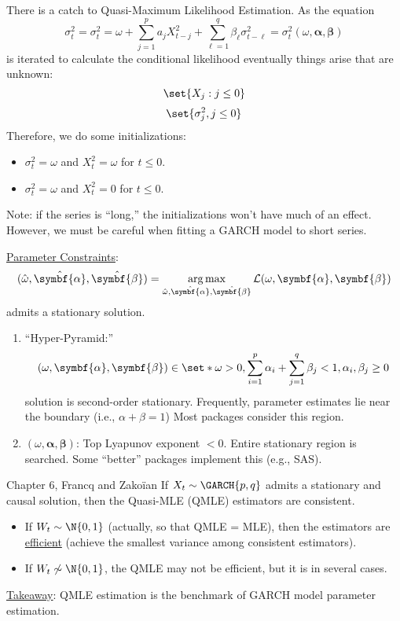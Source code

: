 \begin{Remark}{}{}
    There is a catch to Quasi-Maximum Likelihood Estimation. As the equation
    \[ \sigma_t^2=\sigma_t^2=\omega+\sum_{j=1}^{p} a_j X_{t-j}^2+\sum_{\ell=1}^{q} \beta_\ell \sigma_{t-\ell}^2=\sigma_t^2(\omega,\symbf{\alpha},\symbf{\beta}) \]
    is iterated to calculate the conditional likelihood eventually things arise that are unknown:
    \[ \set{X_j:j\le 0} \]
    \[ \set{\sigma_j^2,j\le 0} \]
    Therefore, we do some initializations:
    \begin{itemize}
        \item $ \sigma_t^2=\omega $ and $ X_t^2=\omega $ for $ t\le 0 $.
        \item $ \sigma_t^2=\omega $ and $ X_t^2=0 $ for $ t\le 0 $.
    \end{itemize}
    Note: if the series is ``long,'' the initializations won't have much of an effect.
    However, we must be careful when fitting a GARCH model to short series.
\end{Remark}
\underline{Parameter Constraints}:
\[ (\hat{\omega},\hat{\symbf{\alpha}},\hat{\symbf{\beta}})=\argmax_{\hat{\omega},\hat{\symbf{\alpha}},\hat{\symbf{\beta}}}\mathcal{L}(\omega,\symbf{\alpha},\symbf{\beta}) \]
admits a stationary solution.
\begin{enumerate}[(1)]
    \item ``Hyper-Pyramid:''
          \[ (\omega,\symbf{\alpha},\symbf{\beta})\in\set*{\omega>0,\sum_{i=1}^{p} \alpha_i+\sum_{j=1}^{q} \beta_j<1,\alpha_i,\beta_j\ge 0} \]
          solution is second-order stationary. Frequently, parameter
          estimates lie near the boundary (i.e., $ \alpha + \beta = 1$) Most packages consider this region.
    \item $ (\omega,\symbf{\alpha},\symbf{\beta}) $: Top Lyapunov exponent $ <0 $. Entire
          stationary region is searched. Some ``better'' packages implement this (e.g., SAS).
\end{enumerate}
\begin{Theorem}{Chapter 6, Francq and Zakoïan}{}
    If $ X_t \sim \GARCH{p,q} $ admits a stationary and causal solution, then
    the Quasi-MLE (QMLE) estimators are consistent.

    \begin{itemize}
        \item If $ W_t \sim \N{0,1} $ (actually, so that QMLE = MLE),
              then the estimators are \underline{efficient} (achieve the smallest variance among consistent estimators).
        \item If $ W_t\not\sim \N{0,1} $, the QMLE may not be efficient, but it is in several cases.
    \end{itemize}

    \underline{Takeaway}: QMLE estimation is the benchmark of GARCH model parameter estimation.
\end{Theorem}

